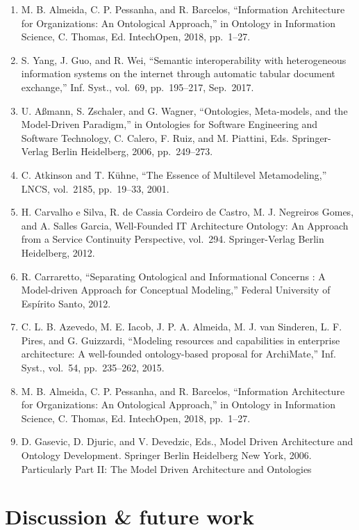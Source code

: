 \documentclass[a4paper,11pt,oneside,oldfontcommands]{memoir}
\newcounter{para}
\theoremstyle{definition}
\theoremstyle{break}		%
\numberwithin{equation}{chapter}
\numberwithin{figure}{chapter}
\begin{document}
\begin{enumerate}
\def\labelenumi{\arabic{enumi}.}
\tightlist
\item
  M. B. Almeida, C. P. Pessanha, and R. Barcelos, ``Information
  Architecture for Organizations: An Ontological Approach,'' in Ontology
  in Information Science, C. Thomas, Ed. IntechOpen, 2018, pp.~1--27.
\item
  S. Yang, J. Guo, and R. Wei, ``Semantic interoperability with
  heterogeneous information systems on the internet through automatic
  tabular document exchange,'' Inf. Syst., vol.~69, pp.~195--217,
  Sep.~2017.
\item
  U. Aßmann, S. Zschaler, and G. Wagner, ``Ontologies, Meta-models, and
  the Model-Driven Paradigm,'' in Ontologies for Software Engineering
  and Software Technology, C. Calero, F. Ruiz, and M. Piattini, Eds.
  Springer-Verlag Berlin Heidelberg, 2006, pp.~249--273.
\item
  C. Atkinson and T. Kühne, ``The Essence of Multilevel Metamodeling,''
  LNCS, vol.~2185, pp.~19--33, 2001.
\item
  H. Carvalho e Silva, R. de Cassia Cordeiro de Castro, M. J. Negreiros
  Gomes, and A. Salles Garcia, Well-Founded IT Architecture Ontology: An
  Approach from a Service Continuity Perspective, vol.~294.
  Springer-Verlag Berlin Heidelberg, 2012.
\item
  R. Carraretto, ``Separating Ontological and Informational Concerns : A
  Model-driven Approach for Conceptual Modeling,'' Federal University of
  Espírito Santo, 2012.
\item
  C. L. B. Azevedo, M. E. Iacob, J. P. A. Almeida, M. J. van Sinderen,
  L. F. Pires, and G. Guizzardi, ``Modeling resources and capabilities
  in enterprise architecture: A well-founded ontology-based proposal for
  ArchiMate,'' Inf. Syst., vol.~54, pp.~235--262, 2015.
\item
  M. B. Almeida, C. P. Pessanha, and R. Barcelos, ``Information
  Architecture for Organizations: An Ontological Approach,'' in Ontology
  in Information Science, C. Thomas, Ed. IntechOpen, 2018, pp.~1--27.
\item
  D. Gasevic, D. Djuric, and V. Devedzic, Eds., Model Driven
  Architecture and Ontology Development. Springer Berlin Heidelberg New
  York, 2006. Particularly Part II: The Model Driven Architecture and
  Ontologies
\end{enumerate}

\hypertarget{discussion-future-work}{%
\chapter{Discussion \& future work}\label{discussion-future-work}}
\end{document}
